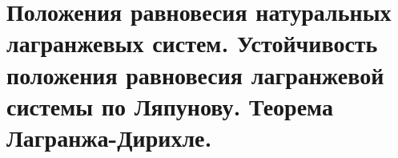 \section{Положения равновесия натуральных лагранжевых систем. Устойчивость положения равновесия лагранжевой системы по Ляпунову. Теорема Лагранжа-Дирихле.}
\label{chasec6}



\newpage